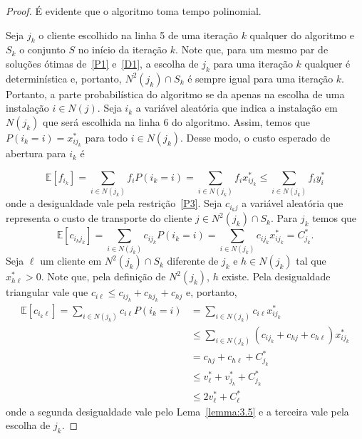 \begin{proof}
É evidente que o algoritmo toma tempo polinomial.

Seja $j_k$ o cliente escolhido na linha 5 de uma iteração $k$ qualquer do algoritmo e $S_k$ o conjunto $S$ no início da iteração $k$. Note que, para um mesmo par de soluções ótimas de~\eqref{P1} e~\eqref{D1}, a escolha de $j_k$ para uma iteração $k$ qualquer é determinística e, portanto, $N^2(j_k) \cap S_k$ é sempre igual para uma iteração $k$. Portanto, a parte probabilística do algoritmo se da apenas na escolha de uma instalação $i \in N(j)$. Seja $i_k$ a variável aleatória que indica a instalação em $N(j_k)$ que será escolhida na linha 6 do algoritmo. Assim, temos que $P(i_k = i) = x_{ij_k}^*$ para todo $i \in N(j_k)$. Desse modo, o custo esperado de abertura para $i_k$ é 

\[ \mathbb{E}[f_{i_k}] = \sum_{i \in N(j_k)} f_i P(i_k = i) = \sum_{i \in N(j_k)} f_i x_{ij_k}^* \leq \sum_{i \in N(j_k)} f_i y^*_i\]
onde a desigualdade vale pela restrição~\ref{P3}. Seja $c_{i_kj}$ a variável aleatória que representa o custo de transporte do cliente $j \in N^2(j_k) \cap S_k$. Para $j_k$ temos que 
\[\mathbb{E}[c_{i_kj_k}] = \sum_{i \in N(j_k)} c_{ij_k} P(i_k = i) = \sum_{i \in N(j_k)} c_{ij_k}x^*_{ij_k} = C^*_{j_k}. \]
Seja $\ell$ um cliente em $N^2(j_k) \cap S_k$ diferente de $j_k$ e $h \in N(j_k)$ tal que $x^*_{h\ell} > 0$. Note que, pela definição de $N^2(j_k)$, $h$ existe. Pela desigualdade triangular vale que $c_{i\ell} \leq c_{ij_k} + c_{hj_k} + c_{hj}$ e, portanto,
\begin{subequations} 
        \begin{align*}
        \mathbb{E}[c_{i_k\ell}] = \sum_{i \in N(j_k)} c_{i\ell} P(i_k = i) &= \sum_{i \in N(j_k)} c_{i\ell}x^*_{ij_k}\\
        &\leq \sum_{i \in N(j_k)} (c_{ij_k} + c_{hj} + c_{h\ell})x^*_{ij_k} \\
        &= c_{hj} + c_{h\ell} + C^*_{j_k}\\
        &\leq v^*_\ell + v^*_{j_k} + C^*_{j_k} \\
        &\leq 2v^*_{\ell} + C^*_\ell 
        \end{align*}
\end{subequations}
onde a segunda desigualdade vale pelo Lema~\ref{lemma:3.5} e a terceira vale pela escolha de $j_k$.


\end{proof}
